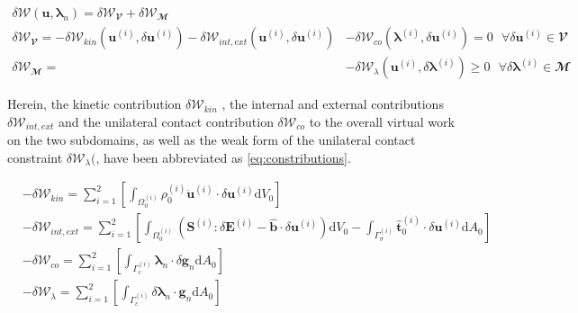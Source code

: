 \documentclass[a4paper,10pt]{article} %
\begin{document}
\begin{subequations}\label{eq:eqfunct}
 \begin{align}
\delta\mathcal{W}(\mathbf{u},\boldsymbol{\lambda}_n) = \delta\mathcal{W}_\mathbfcal{V} + \delta\mathcal{W}_\mathbfcal{M} & \\
\delta\mathcal{W}_\mathbfcal{V} = -\delta \mathcal{W}_{kin}(\mathbf{u}^{(i)},\delta \mathbf{u}^{(i)}) - \delta \mathcal{W}_{int,ext}(\mathbf{u}^{(i)},\delta \mathbf{u}^{(i)}) & - \delta\mathcal{W}_{co}(\boldsymbol{\lambda}^{(i)},\delta \mathbf{u}^{(i)}) = 0 \text{ } \forall \delta \mathbf{u}^{(i)} \in  \mathbfcal{V} \label{eq:subeq8} \\ 
\delta\mathcal{W}_\mathbfcal{M} = & - \delta\mathcal{W}_{\lambda}(\mathbf{u}^{(i)},\delta \boldsymbol{\lambda}^{(i)}) \geq 0 \text{ } \forall \delta \boldsymbol{\lambda}^{(i)} \in  \mathbfcal{M} \label{eq:subeq9}
 \end{align}
\end{subequations}

Herein, the kinetic contribution $\delta \mathcal{W}_{kin}$ , the internal and external contributions $\delta \mathcal{W}_{int,ext}$ and the unilateral contact contribution $\delta\mathcal{W}_{co}$ to the overall virtual work on the two subdomains, as well as the weak form of the unilateral contact constraint $\delta\mathcal{W}_{\lambda}($, have been abbreviated as \eqref{eq:constributions}.

\begin{subequations}\label{eq:constributions}
 \begin{align}
  & -\delta \mathcal{W}_{kin} = \sum_{i = 1}^2 \left[\int_{\Omega_0^{(i)}} \rho_0^{(i)} \ddot{\mathbf{u}}^{(i)} \cdot \delta \mathbf{u}^{(i)} \text{d}V_0\right] \label{eq:subeq10} \\
 & -\delta \mathcal{W}_{int,ext} = \sum_{i = 1}^2 \left[\int_{\Omega_0^{(i)}} \left(\mathbf{S}^{(i)} : \delta \mathbf{E}^{(i)} - \hat{\mathbf{b}}\cdot \delta\mathbf{u}^{(i)} \right) \text{d}V_0 - \int_{\Gamma_\sigma^{(i)}} \hat{\mathbf{t}}_0^{(i)}\cdot\delta\mathbf{u}^{(i)} \text{d}A_0 \right] \label{eq:subeq11} \\
 & -\delta \mathcal{W}_{co} = \sum_{i = 1}^2 \left[\int_{\Gamma_c^{(i)}} \boldsymbol{\lambda}_n \cdot \delta\mathbf{g}_n \text{d}A_0\right] \label{eq:subeq12} \\ 
 & -\delta \mathcal{W}_{\lambda} = \sum_{i = 1}^2 \left[\int_{\Gamma_c^{(i)}} \delta \boldsymbol{\lambda}_n \cdot \mathbf{g}_n \text{d}A_0\right] \label{eq:subeq13}
 \end{align}
\end{subequations}
\end{document}
